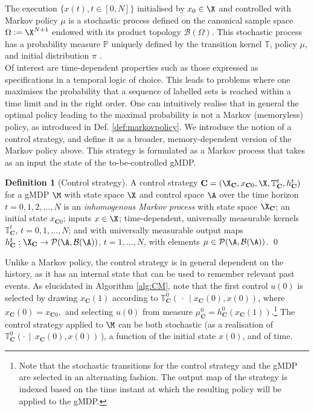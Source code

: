 \documentclass[letterpaper, 10 pt, conference]{amsart}
\theoremstyle{definition}
\newtheorem{defn}[definition]{Definition}
\theoremstyle{example}
\theoremstyle{remark}
\newcommand{\po}{\mathbb{P}}     \newcommand{\p}[1]{\po\left(#1\right)}     \newcommand{\pd}[1]{p\left(#1\right)}     \newcommand{\borel}[1]{\mathcal{B}\left(#1\right)}
\newcommand{\C}{{\mathbf{C}}}
\begin{document}
The execution
$\{x(t), t\in[0,N]\}$ initialised by $x_0\in\X$ and controlled with Markov policy $\mu$ is a stochastic process defined on the canonical sample space $\Omega:= \X^{N+1}$ endowed with its product topology $\mathcal B (\Omega)$. 
This stochastic process has a probability measure $\po$ uniquely defined by the transition kernel $\mathbb T$, policy $\mu$, 
and initial distribution $\pi$ \cite[Prop. 7.45]{bible}.  \\
Of interest are time-dependent properties such as those expressed as specifications in a temporal logic of choice.   
This leads to problems where one maximises the probability that a sequence of labelled sets is reached within a time limit and in the right order. 
One can intuitively realise that in general the optimal policy leading to the maximal probability is not a Markov (memoryless) policy, as introduced in Def. \ref{def:markovpolicy}. 
We introduce the notion of a control strategy, and define it as a broader, memory-dependent version of the Markov policy above. 
This strategy is formulated as a Markov process that takes as an input the state of the to-be-controlled gMDP. 
\begin{defn}[Control strategy]\label{def:CS}
A control strategy $\C=(\X_\C,x_{\C0},\X,\mathbb T^t_\C,h_\C^t)$ for a gMDP $\M$ with state space $\X$ and control space $\A$ over the time horizon $t=0,1,2,\ldots,N$ is an \emph{inhomogenous Markov process} with 
state space $\X_\C$;  
an initial state $x_{\C0}$;  inputs  $x\in\X$; time-dependent, universally measurable kernels $\mathbb T^t_{\C}$, $t=0,1,\ldots,N$;  
and with universally measurable output maps $h^t_\C:\X_\C\rightarrow \mathcal P(\A,\mathcal B(\A))$, $t=1,\ldots,N$,
with elements $\mu\in \mathcal P(\A,\mathcal B(\A))$. \qed  
\end{defn}
Unlike a Markov policy, the control strategy is in general dependent on the history, as it has an internal state that can be used to remember relevant past events.  
As elucidated in Algorithm \ref{alg:CM}, 
note that the first control $u(0)$ is selected by drawing $x_\C(1)$ according to $\mathbb T^0_\C(\,\cdot\,{\mid} x_\C(0),x(0))$, 
where $x_\C(0) = x_{\C0},$ and selecting $u(0)$ from measure $\mu^0_{\C}=h_\C^0(x_\C(1))$.\footnote{Note that the stochastic transitions for the control strategy and the gMDP are selected in an alternating fashion. The output map of the strategy is indexed based on the time instant at which the resulting policy will be applied to the gMDP. }
The control strategy applied to $\M$ can be both stochastic (as a realisation of \mbox{$\mathbb T^0_\C(\cdot\,{\mid}\, x_\C(0),x(0))$\,}), 
a function of the initial state $x(0)$, 
and of time.  
\end{document}

